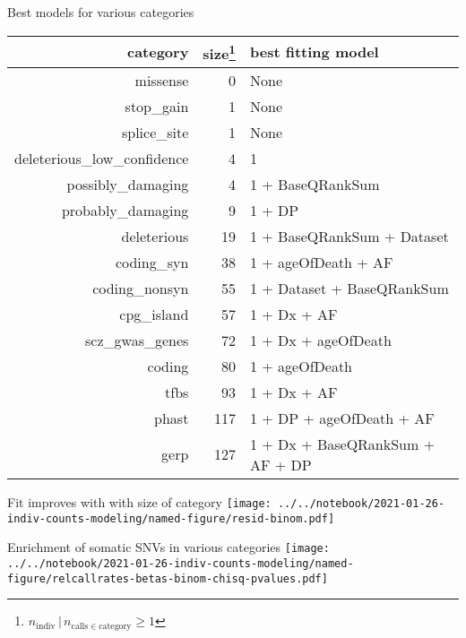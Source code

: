 \documentclass[usenames,dvipsnames]{beamer}
\begin{document}
\begin{frame}{Best models for various categories}
\begin{center}
\tiny
\begin{tabular}{rrl}
\hline
category  & size\footnote{\(n_\mathrm{indiv} \,|\, n_{\mathrm{calls} \in
			\mathrm{category}} \ge 1\)} & best fitting model  \\
\hline
missense  & 0 & None  \\
stop\_gain  & 1 & None  \\
splice\_site  & 1 & None  \\
deleterious\_low\_confidence  & 4 & 1 \\
possibly\_damaging  & 4 & 1 + BaseQRankSum  \\
probably\_damaging  & 9 & 1 + DP  \\
deleterious  & 19 & 1 + BaseQRankSum + Dataset  \\
coding\_syn  & 38 & 1 + ageOfDeath + AF  \\
coding\_nonsyn  & 55 & 1 + Dataset + BaseQRankSum  \\
cpg\_island  & 57 & 1 + Dx + AF  \\
scz\_gwas\_genes  & 72 & 1 + Dx + ageOfDeath  \\
coding  & 80 & 1 + ageOfDeath  \\
tfbs  & 93 & 1 + Dx + AF  \\
phast  & 117 & 1 + DP + ageOfDeath + AF  \\
gerp  & 127 & 1 + Dx + BaseQRankSum + AF + DP  \\
\hline
\end{tabular}
\end{center}
\end{frame}

\begin{frame}{Fit improves with with size of category}
\texttt{[image: ../../notebook/2021-01-26-indiv-counts-modeling/named-figure/resid-binom.pdf]}
\end{frame}

\begin{frame}{Enrichment of somatic SNVs in various categories}
\texttt{[image: ../../notebook/2021-01-26-indiv-counts-modeling/named-figure/relcallrates-betas-binom-chisq-pvalues.pdf]}
\end{frame}
\end{document}
